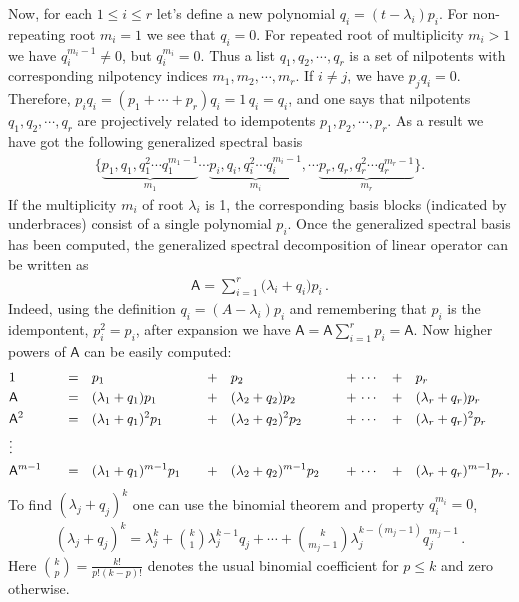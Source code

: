 \documentclass[AMA,STIX1COL]{WileyNJD-v2}
\def\m#1{\mathsf{#1}} %
\def\m#1{\mathsf{#1}}%
\begin{document}
Now, for each $1\le i\le r$ let's define a new polynomial $q_i=(t-\lambda_i)p_i$. For non-repeating root $m_i=1$ we see that $q_i=0$.
For repeated  root of multiplicity $m_i>1$ we have $q_i^{m_i-1}\neq 0$, but $q_i^{m_i}= 0$. Thus a list $q_1, q_2,\cdots,q_r$ is a set of
nilpotents with corresponding nilpotency indices $m_1,m_2,\cdots,m_r$. If $i\neq j$, we have $p_j q_i=0$. Therefore, $p_iq_i=(p_1+\cdots
+p_r)q_i=1\, q_i=q_i$, and one says that nilpotents $q_1, q_2,\cdots,q_r$ are projectively related to idempotents $p_1, p_2,\cdots,p_r$. As a
result we have got the following generalized spectral basis
\begin{align}\label{genSpectralBasis}
\bigl\{
  \underbrace{p_1,q_1,q_1^{2}\cdots q_1^{m_1-1}}_{m_1}  \cdots \underbrace{p_i,q_i,q_i^{2}\cdots q_i^{m_i-1}}_{m_i},\cdots
  \underbrace{p_r,q_r,q_r^{2}\cdots q_r^{m_r-1}}_{m_r}
\bigr\}.
\end{align}
If the multiplicity $m_i$ of root $\lambda_i$ is 1, the corresponding basis
blocks (indicated by underbraces) consist of a single polynomial
$p_i$. Once the generalized spectral basis has been  computed, the
generalized spectral decomposition of linear operator can be
written as
\begin{align}\label{genSpectralDecomposition}
\m{A}=\sum_{i=1}^r \bigl(\lambda_i +q_i\bigr)p_i\,.
\end{align}
Indeed, using the definition  $q_i=(A-\lambda_i)p_i$ and remembering
that $p_i$ is the  idempontent, $p_i^2=p_i$, after expansion we have $\m{A}=\m{A}\sum_{i=1}^r p_i=\m{A}$.
Now higher powers of $\m{A}$  can be easily computed:
\begin{alignat}{5}\label{genSpectralDecompositionPowers}
  & 1\quad&=&\quad p_1\quad&+&\quad p_2\quad &+&\,\cdots\, &+&\quad p_r\notag\\
  & \m{A}\quad&=&\quad (\lambda_1+q_1)p_1\quad&+&\quad  (\lambda_2+q_2)p_2\quad  &+&\,\cdots\, &+&\quad  (\lambda_r+q_r)p_r\notag\\
& \m{A}^2\quad&=&\quad (\lambda_1+q_1)^2 p_1\quad&+&\quad  (\lambda_2+q_2)^2 p_2\quad  &+&\,\cdots\, &+&\quad  (\lambda_r+q_r)^2 p_r\\
  &\vdots&&&&&&&&\notag\\
  & \m{A}^{m-1}\quad&=&\quad (\lambda_1+q_1)^{m-1}p_1\quad&+&\quad  (\lambda_2+q_2)^{m-1} p_2\quad  &+&\,\cdots\, &+&\quad  (\lambda_r+q_r)^{m-1} p_r\, .\notag
\end{alignat}
To find $(\lambda_j+q_j)^{k}$ one can use the  binomial theorem and  property $q_i^{m_i}=0$,
\begin{align}\label{binomialF}
  (\lambda_j+q_j)^{k}=\lambda_j^k+\binom{k}{1}\lambda_j^{k-1}q_j+\cdots+\binom{k}{m_j-1}\lambda_j^{k-(m_j-1)}q_j^{m_j-1}\,.
\end{align}
Here $\binom{k}{p}=\frac{k!}{p!(k-p)!}$ denotes the usual binomial coefficient for $p\le k$ and zero otherwise.
\end{document}
